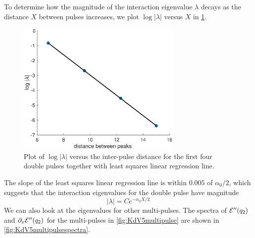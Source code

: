 \documentclass[thesis2.tex]{subfiles}
\begin{document}
To determine how the magnitude of the interaction eigenvalue $\lambda$ decays as the distance $X$ between pulses increases, we plot $\log |\lambda|$ versus $X$ in \cref{fig:KdV5doubleeigdecay}. 
\begin{figure}
\begin{center}
\includegraphics[width=8cm]{images/kdv5numerics/doubleeigdecay.eps}
\caption[Scaling of interaction eigenvalues for KdV5]{Plot of $\log |\lambda|$ versus the inter-pulse distance for the first four double pulses together with least squares linear regression line.}
\label{fig:KdV5doubleeigdecay}
\end{center}
\end{figure}
The slope of the least squares linear regression line is within $0.005$ of $\alpha_0/2$, which suggests that the interaction eigenvalues for the double pulse have magnitude
\[
|\lambda| = C e^{-\alpha_0 X/2}
\] 
We can also look at the eigenvalues for other multi-pulses. The spectra of $\mathcal{E}''(q_2)$ and $\partial_x \mathcal{E}''(q_2)$ for the multi-pulses in \cref{fig:KdV5multipulse} are shown in \cref{fig:KdV5multipulsespectra}. 
\end{document}
